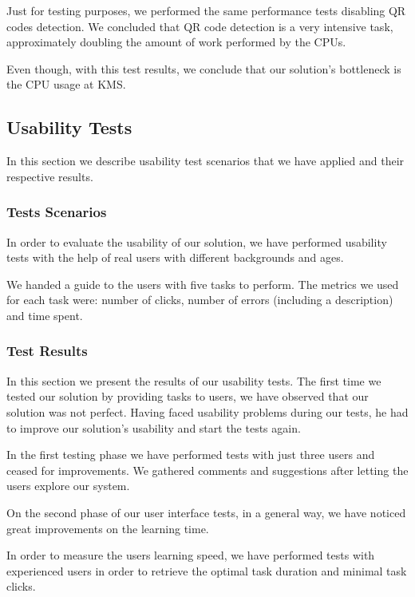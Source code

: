 \documentclass[conference,compsoc,a4paper]{IEEEtran}
\begin{document}
  Just for testing purposes, we performed the same performance tests disabling \gls{QR} codes detection. We concluded that \gls{QR} code detection is a very intensive task, approximately doubling the amount of work performed by the \gls{CPU}s.

	Even though, with this test results, we conclude that our solution's bottleneck is the \gls{CPU} usage at \gls{KMS}.



\subsection {Usability Tests}
     In this section we describe usability test scenarios that we have applied and their respective results.


    \subsubsection{Tests Scenarios}

      In order to evaluate the usability of our solution, we have performed usability tests with the help of real users with different backgrounds and ages.

      We handed a guide to the users with five tasks to perform. The metrics we used for each task were: number of clicks, number of errors (including a description) and time spent. 

  \subsubsection{Test Results}

In this section we present the results of our usability tests. The first time we tested our solution by providing tasks to users, we have observed that our solution was not perfect. Having faced usability problems during our tests, he had to improve our solution's usability and start the tests again.


In the first testing phase we have performed tests with just three users and ceased for improvements. We gathered comments and suggestions after letting the users explore our system.

On the second phase of our user interface tests, in a general way, we have noticed great improvements on the learning time.

In order to measure the users learning speed, we have performed tests with experienced users in order to retrieve the optimal task duration and minimal task clicks.
\end{document}
